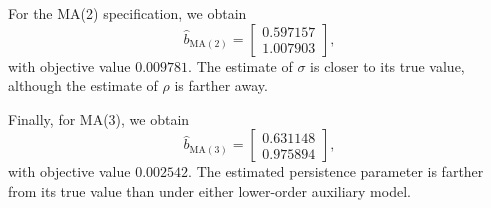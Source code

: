 \documentclass{article}
\begin{document}
For the MA(2) specification, we obtain
\[
    \widehat b_{\mathrm{MA}(2)}
    =
    \begin{bmatrix}
        0.597157\\
        1.007903
    \end{bmatrix},
\]
with objective value $0.009781$.
The estimate of $\sigma$ is closer to its true value,
although the estimate of $\rho$ is farther away.

Finally, for MA(3), we obtain
\[
    \widehat b_{\mathrm{MA}(3)}
    =
    \begin{bmatrix}
        0.631148\\
        0.975894
    \end{bmatrix},
\]
with objective value $0.002542$.
The estimated persistence parameter is farther from
its true value than under either lower-order auxiliary
model.
\end{document}
